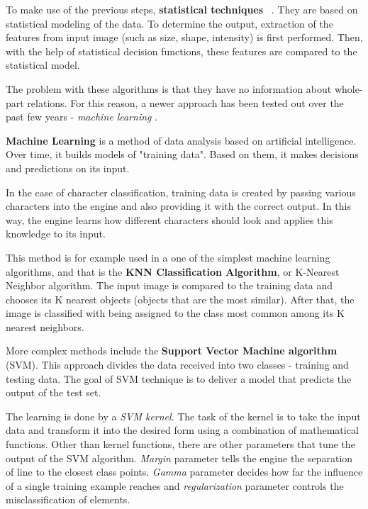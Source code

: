 To make use of the previous steps, \textbf{statistical techniques}~\citep{characterClassification} . They are based on statistical modeling of the data. To determine the output, extraction of the features from input image (such as size, shape, intensity) is first performed. Then, with the help of statistical decision functions, these features are compared to the statistical model.

The problem with these algorithms is that they have no information about whole-part relations. For this reason, a newer approach has been tested out over the past few years - \emph{machine learning} \citep{characterClassification}.

\textbf{Machine Learning} is a method of data analysis based on artificial intelligence. Over time, it builds models of "training data". Based on them, it makes decisions and predictions on its input. 

In the case of character classification, training data is created by passing various characters into the engine and also providing it with the correct output. In this way, the engine learns how different characters should look and applies this knowledge to its input.

This method is for example used in a one of the simplest machine learning algorithms, and that is the \textbf{KNN Classification Algorithm}, or K-Nearest Neighbor algorithm. The input image is compared to the training data and chooses its K nearest objects (objects that are the most similar). After that, the image is classified with being assigned to the class most common among its K nearest neighbors.

More complex methods include the \textbf{Support Vector Machine algorithm} (SVM). This approach divides the data received into two classes - training and testing data. The goal of SVM technique is to deliver a model that predicts the output of the test set.

The learning is done by a \emph{SVM kernel}. The task of the kernel is to take the input data and transform it into the desired form using a combination of mathematical functions. Other than kernel functions, there are other parameters that tune the output of the SVM algorithm. \emph{Margin} parameter tells the engine the separation of line to the closest class points. \emph{Gamma} parameter decides how far the influence of a single training example reaches and \emph{regularization} parameter controls the misclassification of elements.

